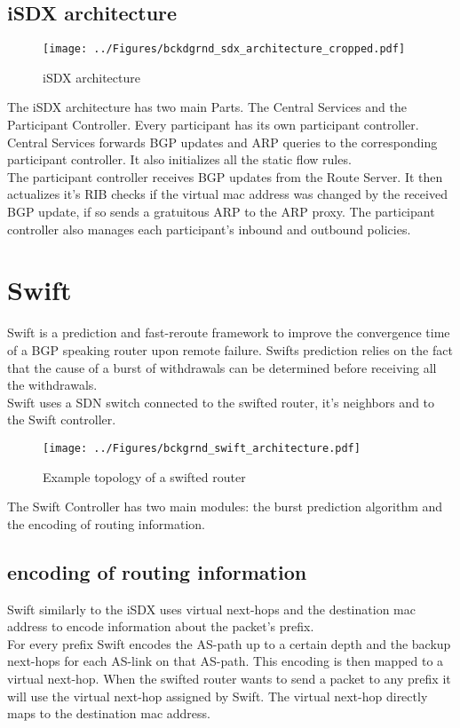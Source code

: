 \subsection{\label{chapter2:iSX:iSDX architecture}iSDX architecture}
\begin{figure}[h]
\texttt{[image: ../Figures/bckdgrnd\_sdx\_architecture\_cropped.pdf]}
\caption{iSDX architecture}
\end{figure}

The iSDX architecture has two main Parts. The Central Services and the Participant Controller. Every participant has its own participant controller. \\
Central Services forwards BGP updates and ARP queries to the corresponding participant controller. It also initializes all the static flow rules. \\
The participant controller receives BGP updates from the Route Server. It then actualizes it's RIB checks if the virtual mac address was changed by the received BGP update, if so sends a gratuitous ARP to the ARP proxy. The participant controller also manages each participant's inbound and outbound policies. 

\section{\label{chapter2:Swift}Swift}

Swift is a prediction and fast-reroute framework to improve the convergence time of a BGP speaking router upon remote failure. Swifts prediction relies on the fact that the cause of a burst of withdrawals can be determined before receiving all the withdrawals. \\ Swift uses a SDN switch connected to the swifted router, it's neighbors and to the Swift controller. 


\begin{figure}[h]
\center
\texttt{[image: ../Figures/bckgrnd\_swift\_architecture.pdf]}
\caption{Example topology of a swifted router}
\end{figure}

The Swift Controller has two main modules: the burst prediction algorithm and the encoding of routing information. 

\subsection{\label{chapter2:Swift:encoding of routing information}encoding of routing information}
Swift similarly to the iSDX uses virtual next-hops and the destination mac address to encode information about the packet's prefix.\\
For every prefix Swift encodes the AS-path up to a certain depth and the backup next-hops for each AS-link on that AS-path. This encoding is then mapped to a virtual next-hop. When the swifted router wants to send a packet to any prefix it will use the virtual next-hop assigned by Swift. The virtual next-hop directly maps to the destination mac address. 

